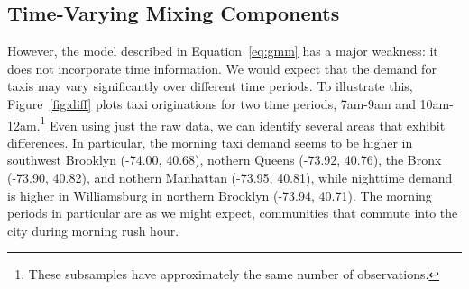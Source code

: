 \documentclass[12pt]{article}
\theoremstyle{definition}
\theoremstyle{algodesc}
\begin{document}
\subsection{Time-Varying Mixing Components} \label{sec:gmm_cat}
However, the model described in Equation~\ref{eq:gmm} has a major weakness: it does not incorporate time information. We would expect that the demand for taxis may vary significantly over different time periods. To illustrate this, Figure~\ref{fig:diff} plots taxi originations for two time periods, 7am-9am and 10am-12am.\footnote{These subsamples have approximately the same number of observations.} Even using just the raw data, we can identify several areas that exhibit differences. In particular, the morning taxi demand seems to be higher in southwest Brooklyn (-74.00, 40.68), nothern Queens (-73.92, 40.76), the Bronx (-73.90, 40.82), and nothern Manhattan (-73.95, 40.81), while nighttime demand is higher in Williamsburg in northern Brooklyn (-73.94, 40.71). The morning periods in particular are as we might expect, communities that commute into the city during morning rush hour.
\end{document}
